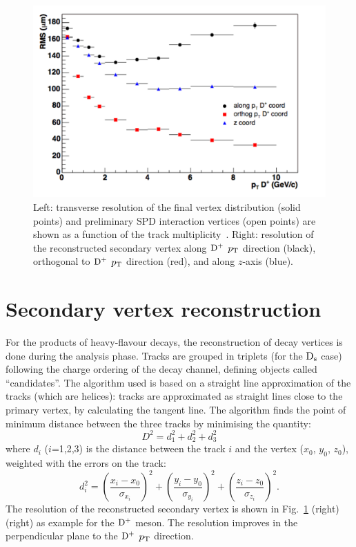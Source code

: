 \begin{itemize}
\begin{figure}[!h]
\includegraphics[width=.49\textwidth]{FigCap3/vertexSec.pdf}
\caption{Left: transverse resolution of the final vertex distribution (solid points) and preliminary SPD interaction vertices (open points) are shown as a function of the track multiplicity~\cite{Abelev:2014ffa}. Right: resolution of the reconstructed secondary vertex along ${\rm D^+}$ $p_{\rm T}$ direction (black), 
orthogonal to ${\rm D^+}$ $p_{\rm T}$ direction (red), and along $z$-axis (blue). }
\label{fig:VtxResol}
\end{figure}
\end{itemize}

\section{Secondary vertex reconstruction}
For the products of heavy-flavour decays, the reconstruction of decay vertices 
is done during the analysis phase. Tracks are grouped in triplets (for the ${\rm D_s}$ case) 
following the charge ordering of the decay channel, defining objects called ``candidates''. 
The algorithm used is based on a straight 
line approximation of the tracks (which are helices): tracks are approximated as straight 
lines close to the primary vertex, by calculating the tangent line.
The algorithm finds the point of minimum distance between the three tracks by minimising the quantity:
\begin{equation}
D^2=d^2_1+d^2_2+d^2_3
\end{equation}
where $d_i$ ($i$=1,2,3) is the distance between the track $i$ and the vertex 
($x_0$, $y_0$, $z_0$), weighted with the errors on the track:
\begin{equation}
d^2_i=\left(\frac{x_i-x_0}{\sigma_{x_i}}\right)^2+
\left(\frac{y_i-y_0}{\sigma_{y_i}}\right)^2+\left(\frac{z_i-z_0}{\sigma_{z_i}}\right)^2.
\end{equation}
The resolution of the reconstructed secondary vertex is shown in Fig.~\ref{fig:VtxResol} (right) 
(right) as example for the ${\rm D^+}$ meson. The 
resolution improves in the perpendicular plane to the ${\rm D^+}$ $p_{\rm T}$ direction.



